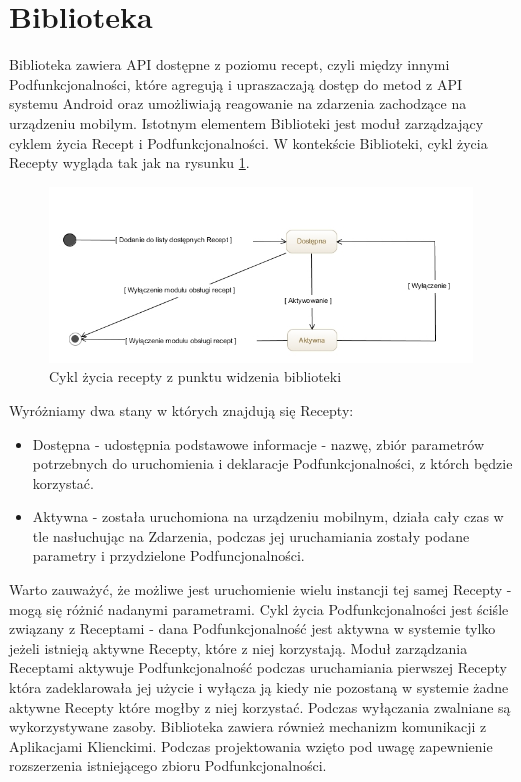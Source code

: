 \documentclass[11pt,a4paper,polish,thesis]{dcsbook}
\begin{document}
\section{Biblioteka}
Biblioteka zawiera API dostępne z poziomu recept, czyli między innymi Podfunkcjonalności, które agregują i upraszaczają dostęp do metod z API systemu Android oraz umożliwiają reagowanie na zdarzenia zachodzące na urządzeniu mobilym.
Istotnym elementem Biblioteki jest moduł zarządzający cyklem życia Recept i Podfunkcjonalności. W kontekście Biblioteki, cykl życia Recepty wygląda tak jak na rysunku
\ref{fig:cykl-zycia-recepty}.
\begin{figure}[H]
  \centering
  \includegraphics[scale=0.6]{./resources/cykl-zycia-recepty.jpg}
  \caption{Cykl życia recepty z punktu widzenia biblioteki}
  \label{fig:cykl-zycia-recepty}
\end{figure}
Wyróżniamy dwa stany w których znajdują się Recepty:
\begin{itemize}
\item Dostępna - udostępnia podstawowe informacje - nazwę, zbiór parametrów potrzebnych do uruchomienia i deklaracje Podfunkcjonalności, z którch będzie korzystać.
\item Aktywna - została uruchomiona na urządzeniu mobilnym, działa cały czas w tle nasłuchując na Zdarzenia, podczas jej uruchamiania zostały podane parametry i przydzielone Podfuncjonalności.
\end{itemize}
Warto zauważyć, że możliwe jest uruchomienie wielu instancji tej samej Recepty - mogą się różnić nadanymi parametrami.
Cykl życia Podfunkcjonalności jest ściśle związany z Receptami - dana Podfunkcjonalność jest aktywna w systemie tylko jeżeli istnieją aktywne Recepty, które z niej korzystają. 
Moduł zarządzania Receptami aktywuje Podfunkcjonalność podczas uruchamiania pierwszej Recepty która zadeklarowała jej użycie i wyłącza ją kiedy nie pozostaną w systemie żadne aktywne Recepty które mogłby z niej korzystać.
Podczas wyłączania zwalniane są wykorzystywane zasoby. Biblioteka zawiera również mechanizm komunikacji z Aplikacjami Klienckimi. Podczas projektowania wzięto pod uwagę zapewnienie rozszerzenia istniejącego zbioru Podfunkcjonalności.
\end{document}
